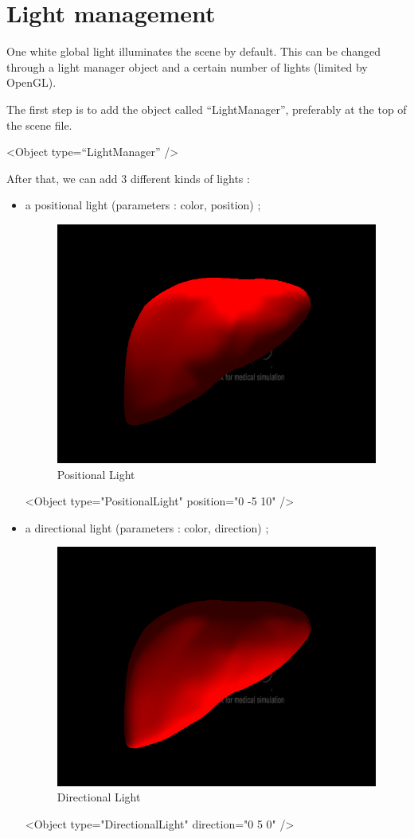
\newpage

\section{Light management}

One white global light illuminates the scene by default. This can be changed
through a light manager object and a certain number of lights (limited by
OpenGL).

The first step is to add the object called ``LightManager'', preferably at the
top of the scene file.
\begin{code_xml}
	<Object type=``LightManager'' />
\end{code_xml}

After that, we can add 3 different kinds of lights :
\begin{itemize}
  \item a positional light (parameters : color, position) ;
	\begin{figure}[!h]
	\centering
	\includegraphics[width=0.33\linewidth]{rendering/images/light_pos.png}
	\caption{Positional Light}
	\end{figure}

	\begin{code_xml}
		<Object type="PositionalLight" position="0 -5 10" />
	\end{code_xml}
  \item a directional light (parameters : color, direction) ; 
	\begin{figure}[!h]
	\centering
	\includegraphics[width=0.33\linewidth]{rendering/images/light_dir.png}
	\caption{Directional Light}
	\end{figure}

	\begin{code_xml}
		<Object type="DirectionalLight" direction="0 5 0" />
	\end{code_xml}
\newpage


\end{itemize}
